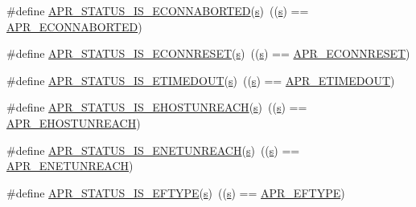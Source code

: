 \begin{DoxyCompactItemize}
\item 
\#define \hyperlink{group__APR__STATUS__IS_ga528a8032b13c75fbdeb9bf7e4c0be493}{A\+P\+R\+\_\+\+S\+T\+A\+T\+U\+S\+\_\+\+I\+S\+\_\+\+E\+C\+O\+N\+N\+A\+B\+O\+R\+T\+ED}(\hyperlink{pcretest_8txt_a062597889ba244b72877454b1d3adecf}{s})~((\hyperlink{pcretest_8txt_a062597889ba244b72877454b1d3adecf}{s}) == \hyperlink{group__APR__Error_ga9458da18e0ee46a5d37c9cdfdc43efd2}{A\+P\+R\+\_\+\+E\+C\+O\+N\+N\+A\+B\+O\+R\+T\+ED})
\item 
\#define \hyperlink{group__APR__STATUS__IS_ga85e2cb1b4c904a9edfbc0d94203f76b6}{A\+P\+R\+\_\+\+S\+T\+A\+T\+U\+S\+\_\+\+I\+S\+\_\+\+E\+C\+O\+N\+N\+R\+E\+S\+ET}(\hyperlink{pcretest_8txt_a062597889ba244b72877454b1d3adecf}{s})~((\hyperlink{pcretest_8txt_a062597889ba244b72877454b1d3adecf}{s}) == \hyperlink{group__APR__Error_ga264bfe2056e917728e9ed060b58869c2}{A\+P\+R\+\_\+\+E\+C\+O\+N\+N\+R\+E\+S\+ET})
\item 
\#define \hyperlink{group__APR__STATUS__IS_ga6adc2f539eabedb504294458be4f6251}{A\+P\+R\+\_\+\+S\+T\+A\+T\+U\+S\+\_\+\+I\+S\+\_\+\+E\+T\+I\+M\+E\+D\+O\+UT}(\hyperlink{pcretest_8txt_a062597889ba244b72877454b1d3adecf}{s})~((\hyperlink{pcretest_8txt_a062597889ba244b72877454b1d3adecf}{s}) == \hyperlink{group__APR__Error_ga6aeccbe9accb34f0adc1cb1ab9a82a8d}{A\+P\+R\+\_\+\+E\+T\+I\+M\+E\+D\+O\+UT})
\item 
\#define \hyperlink{group__APR__STATUS__IS_gad9307ff02e50296c528b79a670dc80bb}{A\+P\+R\+\_\+\+S\+T\+A\+T\+U\+S\+\_\+\+I\+S\+\_\+\+E\+H\+O\+S\+T\+U\+N\+R\+E\+A\+CH}(\hyperlink{pcretest_8txt_a062597889ba244b72877454b1d3adecf}{s})~((\hyperlink{pcretest_8txt_a062597889ba244b72877454b1d3adecf}{s}) == \hyperlink{group__APR__Error_ga489b0c02fa7cf33ed6d698d385661f86}{A\+P\+R\+\_\+\+E\+H\+O\+S\+T\+U\+N\+R\+E\+A\+CH})
\item 
\#define \hyperlink{group__APR__STATUS__IS_ga19911958b3dd62559fb6c245ec579c27}{A\+P\+R\+\_\+\+S\+T\+A\+T\+U\+S\+\_\+\+I\+S\+\_\+\+E\+N\+E\+T\+U\+N\+R\+E\+A\+CH}(\hyperlink{pcretest_8txt_a062597889ba244b72877454b1d3adecf}{s})~((\hyperlink{pcretest_8txt_a062597889ba244b72877454b1d3adecf}{s}) == \hyperlink{group__APR__Error_gab9b7124a88817d1b69cdef059f7dc689}{A\+P\+R\+\_\+\+E\+N\+E\+T\+U\+N\+R\+E\+A\+CH})
\item 
\#define \hyperlink{group__APR__STATUS__IS_gaf37f4f8f6c929728bf55b927576bdb69}{A\+P\+R\+\_\+\+S\+T\+A\+T\+U\+S\+\_\+\+I\+S\+\_\+\+E\+F\+T\+Y\+PE}(\hyperlink{pcretest_8txt_a062597889ba244b72877454b1d3adecf}{s})~((\hyperlink{pcretest_8txt_a062597889ba244b72877454b1d3adecf}{s}) == \hyperlink{group__APR__Error_gac358701354d03c37e3f0de12ed6d9afc}{A\+P\+R\+\_\+\+E\+F\+T\+Y\+PE})

\end{DoxyCompactItemize}
